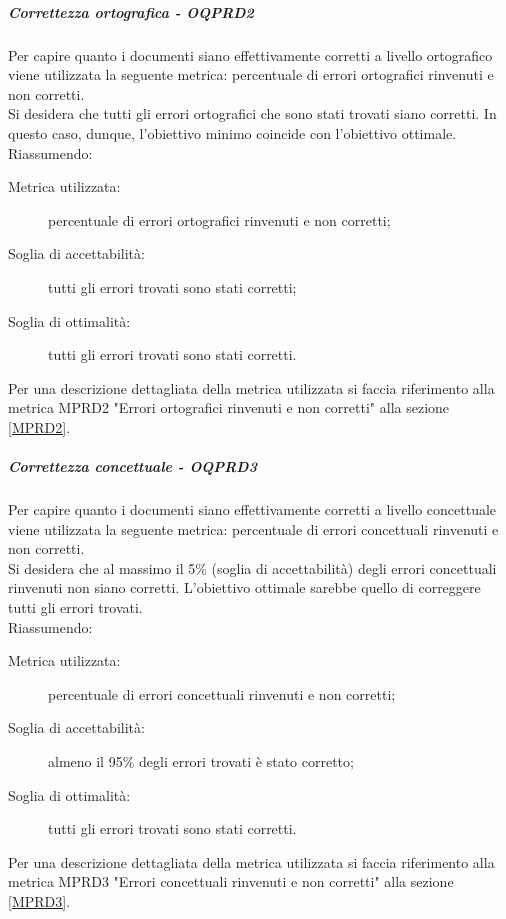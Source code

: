 \documentclass[../PianoDiQualifica.tex]{subfiles}
\begin{document}
				\subparagraph{Correttezza ortografica - OQPRD2}
				Per capire quanto i documenti siano effettivamente corretti a livello ortografico viene utilizzata la seguente metrica: percentuale di errori ortografici rinvenuti e non corretti.\\
				Si desidera che tutti gli errori ortografici che sono stati trovati siano corretti. In questo caso, dunque, l'obiettivo minimo coincide con l’obiettivo ottimale.\\
				Riassumendo:
				\begin{description}
					\item[Metrica utilizzata:] percentuale di errori ortografici rinvenuti e non corretti;
					\item[Soglia di accettabilità:] tutti gli errori trovati sono stati corretti;
					\item[Soglia di ottimalità:] tutti gli errori trovati sono stati corretti.
				\end{description}
				Per una descrizione dettagliata della metrica utilizzata si faccia riferimento alla metrica MPRD2 "Errori ortografici rinvenuti e non corretti" alla sezione \ref{MPRD2}.
				
				\subparagraph{Correttezza concettuale - OQPRD3}
				Per capire quanto i documenti siano effettivamente corretti a livello concettuale viene utilizzata la seguente metrica: percentuale di errori concettuali rinvenuti e non corretti.\\
				Si desidera che al massimo il 5\% (soglia di accettabilità) degli errori concettuali rinvenuti non siano corretti. L’obiettivo ottimale sarebbe quello di correggere tutti gli errori trovati.\\
				Riassumendo:
				\begin{description}
					\item[Metrica utilizzata:] percentuale di errori concettuali rinvenuti e non corretti;
					\item[Soglia di accettabilità:] almeno il 95\% degli errori trovati è stato corretto;
					\item[Soglia di ottimalità:] tutti gli errori trovati sono stati corretti.
				\end{description}
				Per una descrizione dettagliata della metrica utilizzata si faccia riferimento alla metrica MPRD3 "Errori concettuali rinvenuti e non corretti" alla sezione \ref{MPRD3}.
			
\end{document}
